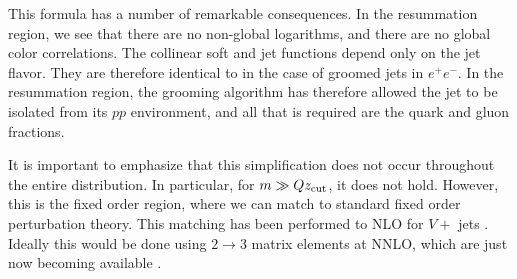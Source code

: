 This formula has a number of remarkable consequences. In the resummation region, we see that there are no non-global logarithms, and there are no global color correlations. The collinear soft and jet functions depend only on the jet flavor. They are therefore identical to in the case of groomed jets in $e^+e^-$. In the resummation region, the grooming algorithm has therefore allowed the jet to be isolated from its $pp$ environment, and all that is required are the quark and gluon fractions. 


It is important to emphasize that this simplification does not occur throughout the entire distribution. In particular, for $m \gg Qz_{\rm cut}$, it does not hold. However, this is the fixed order region, where we can match to standard fixed order perturbation theory. This matching has been performed to NLO for $V+$ jets \cite{Frye:2016aiz,Marzani:2017kqd,Marzani:2017mva}.  Ideally this would be done using $2\to 3$ matrix elements at NNLO, which are just now becoming available \cite{Gehrmann:2015bfy,Dunbar:2016aux,Badger:2013yda,Badger:2017jhb,Abreu:2017hqn}.



%

%
%


